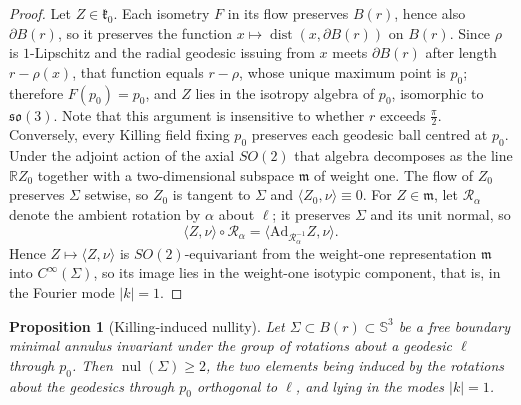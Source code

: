 \documentclass[11pt,a4paper]{amsart}
\theoremstyle{plain}
\newtheorem{proposition}[theorem]{Proposition}
\theoremstyle{definition}
\newcommand{\R}{\mathbb{R}}
\newcommand{\Sph}{\mathbb{S}}
\newcommand{\nul}{\operatorname{nul}}
\newcommand{\dist}{\operatorname{dist}}
\begin{document}
\begin{proof}
Let $Z\in\mathfrak{k}_0$. Each isometry $F$ in its flow preserves $B(r)$, hence also $\partial B(r)$, so it preserves the function $x\mapsto\dist(x,\partial B(r))$ on $B(r)$. Since $\rho$ is $1$-Lipschitz and the radial geodesic issuing from $x$ meets $\partial B(r)$ after length $r-\rho(x)$, that function equals $r-\rho$, whose unique maximum point is $p_0$; therefore $F(p_0)=p_0$, and $Z$ lies in the isotropy algebra of $p_0$, isomorphic to $\mathfrak{so}(3)$. Note that this argument is insensitive to whether $r$ exceeds $\tfrac\pi2$. Conversely, every Killing field fixing $p_0$ preserves each geodesic ball centred at $p_0$. Under the adjoint action of the axial $SO(2)$ that algebra decomposes as the line $\R Z_0$ together with a two-dimensional subspace $\mathfrak{m}$ of weight one. The flow of $Z_0$ preserves $\Sigma$ setwise, so $Z_0$ is tangent to $\Sigma$ and $\langle Z_0,\nu\rangle\equiv 0$. For $Z\in\mathfrak{m}$, let $\mathcal{R}_\alpha$ denote the ambient rotation by $\alpha$ about $\ell$; it preserves $\Sigma$ and its unit normal, so
\[
\langle Z,\nu\rangle\circ\mathcal{R}_\alpha=\langle \mathrm{Ad}_{\mathcal{R}_\alpha^{-1}}Z,\nu\rangle .
\]
Hence $Z\mapsto\langle Z,\nu\rangle$ is $SO(2)$-equivariant from the weight-one representation $\mathfrak{m}$ into $C^\infty(\Sigma)$, so its image lies in the weight-one isotypic component, that is, in the Fourier mode $|k|=1$.
\end{proof}

\begin{proposition}[Killing-induced nullity]\label{prop:killnul}
Let $\Sigma\subset B(r)\subset\Sph^3$ be a free boundary minimal annulus invariant under the group of rotations about a geodesic $\ell$ through $p_0$. Then $\nul(\Sigma)\geq 2$, the two elements being induced by the rotations about the geodesics through $p_0$ orthogonal to $\ell$, and lying in the modes $|k|=1$.
\end{proposition}
\end{document}
